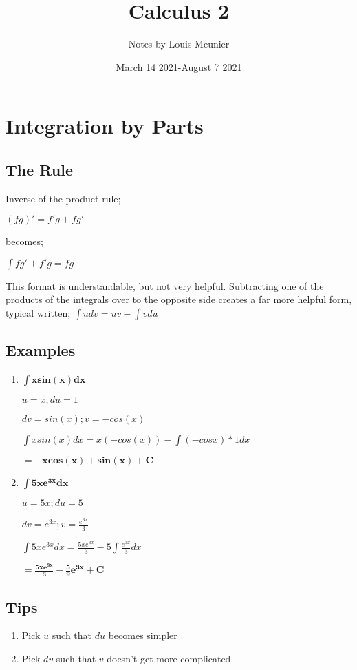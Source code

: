 \documentclass{article}
\title{Calculus 2}
\author{Notes by Louis Meunier}
\date{March 14 2021-August 7 2021}
\begin{document}
\maketitle

\section{Integration by Parts}
\subsection{The Rule}
Inverse of the product rule;

$(fg)' = f'g + fg'$

becomes;

$\int fg' + f'g = fg$

This format is understandable, but not very helpful. Subtracting one of the products of the integrals over to the opposite side creates a far more helpful form, typical written; $\int udv = uv - \int vdu$

\subsection{Examples}
\begin{enumerate}
    \item $\mathbf{\int xsin(x) dx}$
    
    $u = x; du = 1$
    
    $dv = sin(x); v = -cos(x)$
    
    $\int xsin(x) dx = x(-cos(x)) - \int(-cosx) * 1 dx$
    
    $= \mathbf{-xcos(x) + sin(x) + C}$
    \item $\mathbf{\int 5xe^{3x} dx}$
    
    $u = 5x; du = 5$
    
    $dv = e^{3x}; v = \frac{e^{3x}}{3}$
    
    $\int 5xe^{3x} dx = \frac{5xe^{3x}}{3} - 5\int\frac{e^{3x}}{3} dx$
    
    $= \mathbf{\frac{5xe^{3x}}{3} - \frac{5}{9}e^{3x} + C}$
\end{enumerate}

\subsection{Tips}
\begin{enumerate}
    \item Pick $u$ such that $du$ becomes simpler
    \item Pick $dv$ such that $v$ doesn't get more complicated
\end{enumerate}
\end{document}

